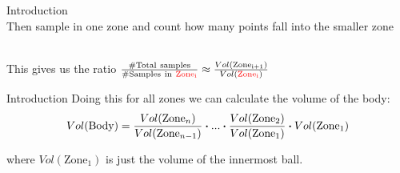\documentclass[table]{beamer}
\begin{document}
\begin{frame}[t]{Introduction}
    \\[1.05ex]
    Then sample in one zone and count how many points fall into the smaller zone
    \begin{center}
    \end{center}
    \ \\
    This gives us the ratio  $\frac{\mathrm{\#Total\ samples}}{\mathrm{\#Samples\ in\ {\color{red}Zone_{i}}}} \approx \frac{Vol({\mathrm{Zone_{i+1}})}}{Vol({\color{red}\mathrm{Zone_{i}}})}$
\end{frame}


\begin{frame}{Introduction}
    Doing this for all zones we can calculate the volume of the body:
\vspace{20pt}
\begin{equation*}
Vol(\mathrm{Body}) = 
\frac{Vol(\mathrm{Zone}_n)}{Vol(\mathrm{Zone}_{n-1})}
\boldsymbol{\cdot} ... \boldsymbol{\cdot}
\frac{Vol(\mathrm{Zone}_2)}{Vol(\mathrm{Zone}_1)} 
\boldsymbol{\cdot} Vol(\mathrm{Zone}_1)
\vspace{20pt}
\end{equation*}
\begin{center} 
    where $Vol(\mathrm{Zone}_1)$ is just the volume of the innermost ball.
\end{center}
\end{frame}
\end{document}
